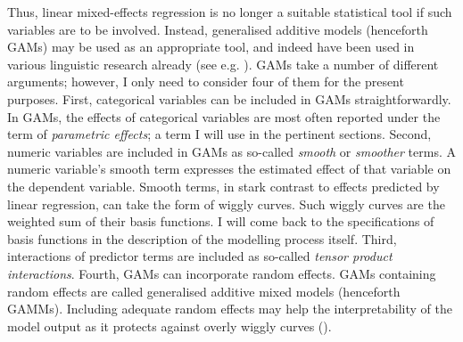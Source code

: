 Thus, linear mixed-effects regression is no longer a suitable statistical tool if such variables are to be involved. Instead, generalised additive models (henceforth GAMs) may be used as an appropriate tool, and indeed have been used in various linguistic research already (see e.g. \cite{Wieling2011, Linke2017, Milin2017, Tomaschek2018b}). GAMs take a number of different arguments; however, I only need to consider four of them for the present purposes. First, categorical variables can be included in GAMs straightforwardly. In GAMs, the effects of categorical variables are most often reported under the term of \textit{parametric effects}; a term I will use in the pertinent sections. Second, numeric variables are included in GAMs as so-called \textit{smooth} or \textit{smoother} terms. A numeric variable’s smooth term expresses the estimated effect of that variable on the dependent variable. Smooth terms, in stark contrast to effects predicted by linear regression, can take the form of wiggly curves. Such wiggly curves are the weighted sum of their basis functions. I will come back to the specifications of basis functions in the description of the modelling process itself. Third, interactions of predictor terms are included as so-called \textit{tensor product interactions}. Fourth, GAMs can incorporate random effects. GAMs containing random effects are called generalised additive mixed models (henceforth GAMMs). Including adequate random effects may help the interpretability of the model output as it protects against overly wiggly curves (\cite{Baayen2020}).

